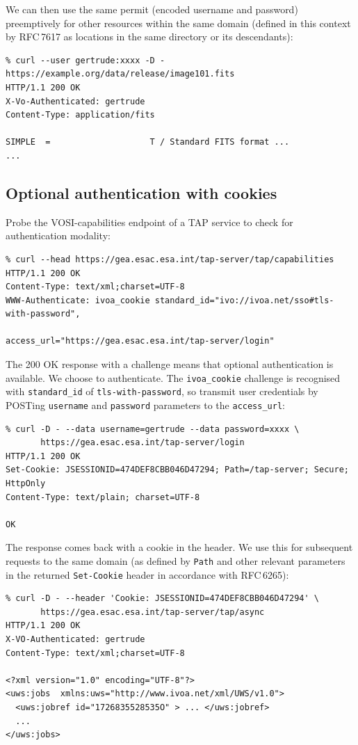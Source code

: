 \documentclass[11pt,a4paper]{ivoa}
\newcommand{\rfc}[1]{RFC\,#1}
\newcommand{\header}[1]{{\tt #1}}
\begin{document}
\noindent
We can then use the same permit (encoded username and password)
preemptively for other resources within the same domain
(defined in this context by \rfc{7617} as locations in the same
directory or its descendants):
{\footnotesize
\begin{verbatim}
% curl --user gertrude:xxxx -D - https://example.org/data/release/image101.fits
HTTP/1.1 200 OK
X-Vo-Authenticated: gertrude
Content-Type: application/fits

SIMPLE  =                    T / Standard FITS format ...
...
\end{verbatim}
}


\subsection{Optional authentication with cookies}
\label{sec:cookie-example}


Probe the VOSI-capabilities endpoint of a TAP service to check
for authentication modality:
{\footnotesize
\begin{verbatim}
% curl --head https://gea.esac.esa.int/tap-server/tap/capabilities
HTTP/1.1 200 OK
Content-Type: text/xml;charset=UTF-8
WWW-Authenticate: ivoa_cookie standard_id="ivo://ivoa.net/sso#tls-with-password",
                              access_url="https://gea.esac.esa.int/tap-server/login"
\end{verbatim}
}

\noindent
The 200 OK response with a challenge means that optional authentication
is available.
We choose to authenticate.
The \verb|ivoa_cookie| challenge is recognised with \verb|standard_id|
of \verb|tls-with-password|, so transmit user credentials
by POSTing \verb|username| and \verb|password| parameters
to the \verb|access_url|:
{\footnotesize
\begin{verbatim}
% curl -D - --data username=gertrude --data password=xxxx \
       https://gea.esac.esa.int/tap-server/login
HTTP/1.1 200 OK
Set-Cookie: JSESSIONID=474DEF8CBB046D47294; Path=/tap-server; Secure; HttpOnly
Content-Type: text/plain; charset=UTF-8

OK
\end{verbatim}
}

\noindent
The response comes back with a cookie in the header.
We use this for subsequent requests to the same domain
(as defined by {\tt Path} and other relevant parameters in the
returned \header{Set-Cookie} header in accordance with \rfc{6265}):
{\footnotesize
\begin{verbatim}
% curl -D - --header 'Cookie: JSESSIONID=474DEF8CBB046D47294' \
       https://gea.esac.esa.int/tap-server/tap/async
HTTP/1.1 200 OK
X-VO-Authenticated: gertrude
Content-Type: text/xml;charset=UTF-8

<?xml version="1.0" encoding="UTF-8"?>
<uws:jobs  xmlns:uws="http://www.ivoa.net/xml/UWS/v1.0">
  <uws:jobref id="1726835528535O" > ... </uws:jobref>
  ...
</uws:jobs>
\end{verbatim}
}
\end{document}
